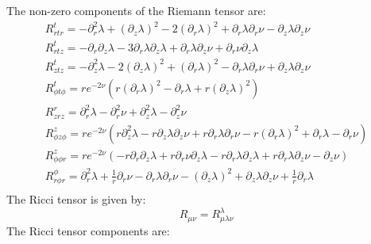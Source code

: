 \documentclass{article}
\begin{document}
The non-zero components of the Riemann tensor are:
\begin{equation}
\begin{array}{l}
R^{t}_{rtr}=-\partial^{2}_{r}\lambda+\left(\partial_{z}\lambda\right)^{2}-2\left(\partial_{r}\lambda\right)^{2}+\partial_{r}\lambda\partial_{r}\nu-\partial_{z}\lambda\partial_{z}\nu\\
R^{t}_{rtz}=-\partial_{r}\partial_{z}\lambda-3\partial_{r}\lambda\partial_{z}\lambda+\partial_{r}\lambda\partial_{z}\nu+\partial_{r}\nu\partial_{z}\lambda\\
R^{t}_{ztz}=-\partial^{2}_{z}\lambda-2\left(\partial_{z}\lambda\right)^{2}+\left(\partial_{r}\lambda\right)^{2}-\partial_{r}\lambda\partial_{r}\nu+\partial_{z}\lambda\partial_{z}\nu\\
R^{t}_{\phi t\phi}=re^{-2\nu}\left(r\left(\partial_{r}\lambda\right)^{2}-\partial_{r}\lambda+r\left(\partial_{z}\lambda\right)^{2}\right)\\
R^{r}_{zrz}=\partial^{2}_{r}\lambda-\partial^{2}_{r}\nu+\partial^{2}_{z}\lambda-\partial^{2}_{z}\nu\\
R^{z}_{\phi z\phi}=re^{-2\nu}\left(r\partial^{2}_{z}\lambda-r\partial_{z}\lambda\partial_{z}\nu+r\partial_{r}\lambda\partial_{r}\nu-r\left(\partial_{r}\lambda\right)^{2}+\partial_{r}\lambda-\partial_{r}\nu\right)\\
R^{z}_{\phi\phi r}=re^{-2\nu}\left(-r\partial_{r}\partial_{z}\lambda+r\partial_{r}\nu\partial_{z}\lambda-r\partial_{r}\lambda\partial_{z}\lambda+r\partial_{r}\lambda\partial_{z}\nu-\partial_{z}\nu\right)\\
R^{\phi}_{r\phi r}=\partial^{2}_{r}\lambda+\frac{1}{r}\partial_{r}\nu-\partial_{r}\lambda\partial_{r}\nu-\left(\partial_{z}\lambda\right)^{2}+\partial_{z}\lambda\partial_{z}\nu+\frac{1}{r}\partial_{r}\lambda\\
\end{array}
\end{equation}
The Ricci tensor is given by:
\begin{equation}
R_{\mu\nu}=R_{\mu\lambda\nu}^{\lambda}
\end{equation}
The Ricci tensor components are:
\end{document}
